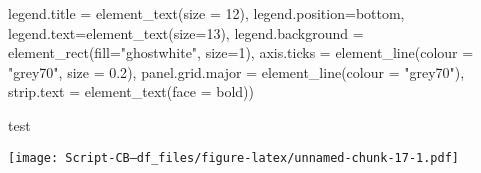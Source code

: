 \documentclass[
]{article}
\newenvironment{Shaded}{\begin{snugshade}}{\end{snugshade}}
\newcommand{\AttributeTok}[1]{\textcolor[rgb]{0.77,0.63,0.00}{#1}}
\newcommand{\DecValTok}[1]{\textcolor[rgb]{0.00,0.00,0.81}{#1}}
\newcommand{\FloatTok}[1]{\textcolor[rgb]{0.00,0.00,0.81}{#1}}
\newcommand{\FunctionTok}[1]{\textcolor[rgb]{0.00,0.00,0.00}{#1}}
\newcommand{\NormalTok}[1]{#1}
\newcommand{\StringTok}[1]{\textcolor[rgb]{0.31,0.60,0.02}{#1}}
\begin{document}
\begin{Shaded}
\begin{Highlighting}[]
        \AttributeTok{legend.title =} \FunctionTok{element\_text}\NormalTok{(}\AttributeTok{size =} \DecValTok{12}\NormalTok{),}
        \AttributeTok{legend.position=}\StringTok{\textquotesingle{}bottom\textquotesingle{}}\NormalTok{,}
        \AttributeTok{legend.text=}\FunctionTok{element\_text}\NormalTok{(}\AttributeTok{size=}\DecValTok{13}\NormalTok{),}
        \AttributeTok{legend.background =} \FunctionTok{element\_rect}\NormalTok{(}\AttributeTok{fill=}\StringTok{"ghostwhite"}\NormalTok{, }\AttributeTok{size=}\DecValTok{1}\NormalTok{),}
        \AttributeTok{axis.ticks =} \FunctionTok{element\_line}\NormalTok{(}\AttributeTok{colour =} \StringTok{"grey70"}\NormalTok{, }\AttributeTok{size =} \FloatTok{0.2}\NormalTok{),}
        \AttributeTok{panel.grid.major =} \FunctionTok{element\_line}\NormalTok{(}\AttributeTok{colour =} \StringTok{"grey70"}\NormalTok{),}
        \AttributeTok{strip.text =} \FunctionTok{element\_text}\NormalTok{(}\AttributeTok{face =} \StringTok{\textquotesingle{}bold\textquotesingle{}}\NormalTok{)) }
  
\NormalTok{test}
\end{Highlighting}
\end{Shaded}

\texttt{[image: Script-CB---df\_files/figure-latex/unnamed-chunk-17-1.pdf]}
\end{document}
